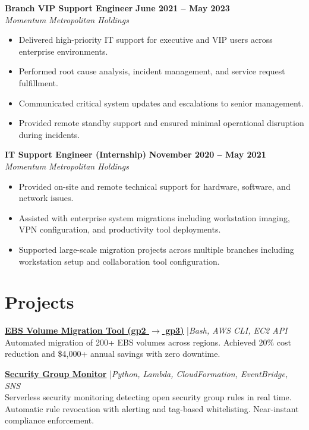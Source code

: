 \documentclass[11pt,a4paper]{article}
\begin{document}
\textbf{Branch VIP Support Engineer} \hfill \textbf{June 2021 -- May 2023}\\
\textit{Momentum Metropolitan Holdings}
\begin{itemize}
  \item Delivered high-priority IT support for executive and VIP users across enterprise environments.
  \item Performed root cause analysis, incident management, and service request fulfillment.
  \item Communicated critical system updates and escalations to senior management.
  \item Provided remote standby support and ensured minimal operational disruption during incidents.
\end{itemize}

\textbf{IT Support Engineer (Internship)} \hfill \textbf{November 2020 -- May 2021}\\
\textit{Momentum Metropolitan Holdings}
\begin{itemize}
  \item Provided on-site and remote technical support for hardware, software, and network issues.
  \item Assisted with enterprise system migrations including workstation imaging, VPN configuration, and productivity tool deployments.
  \item Supported large-scale migration projects across multiple branches including workstation setup and collaboration tool configuration.
\end{itemize}

\section{Projects}

\href{https://github.com/mamathebula/ebs-volume-migration}{\color{linkblue}\textbf{EBS Volume Migration Tool (gp2 $\rightarrow$ gp3)}} \enspace|\enspace \textit{Bash, AWS CLI, EC2 API}\\
Automated migration of 200+ EBS volumes across regions. Achieved 20\% cost reduction and \$4,000+ annual savings with zero downtime.

\href{https://github.com/mamathebula/security-group-monitor}{\color{linkblue}\textbf{Security Group Monitor}} \enspace|\enspace \textit{Python, Lambda, CloudFormation, EventBridge, SNS}\\
Serverless security monitoring detecting open security group rules in real time. Automatic rule revocation with alerting and tag-based whitelisting. Near-instant compliance enforcement.
\end{document}
